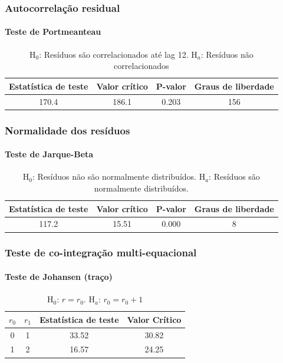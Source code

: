 \documentclass{beamer}
\begin{document}
\begin{frame}
    \frametitle{Autocorrelação residual}
    \framesubtitle{Teste de Portmeanteau}
    \begin{table}[!hbt]
        \begin{tabular}{|cccc|}
            \hline
            Estatística de teste & Valor crítico & P-valor & Graus de liberdade  \\
            \hline
            170.4          &          186.1          &      0.203       &     156      \\
            \hline
        \end{tabular}
        \caption*{$ \text{H}_0 $: Resíduos são correlacionados até lag 12. \newline $ \text{H}_a $: Resíduos não correlacionados}
    \end{table}
\end{frame}


\begin{frame}
    \frametitle{Normalidade dos resíduos}
    \framesubtitle{Teste de Jarque-Beta}
    \begin{table}[!hbt]
        \begin{tabular}{|cccc|}
            \hline
            Estatística de teste & Valor crítico & P-valor & Graus de liberdade  \\
            \hline
            117.2          &          15.51          &      0.000       &      8       \\
            \hline
        \end{tabular}
        \caption*{$ \text{H}_0 $: Resíduos não são normalmente distribuídos. \newline $ \text{H}_a $: Resíduos são normalmente distribuídos.}
    \end{table}
\end{frame}

\begin{frame}
    \frametitle{Teste de co-integração multi-equacional}
    \framesubtitle{Teste de Johansen (traço)}
    \begin{table}[!hbt]
        \begin{tabular}{|cccc|}
            \hline
            $ r_0 $ & $ r_1 $ & Estatística de teste & Valor Crítico \\
            \hline
            0 &             1 &                   33.52 &                   30.82  \\
            1 &             2 &                   16.57 &                   24.25  \\
            \hline
        \end{tabular}
        \caption*{$ \text{H}_0 $: $ r =  r_0 $. $ \text{H}_a $: $ r_0 = r_0 + 1 $}
    \end{table}
\end{frame}
\end{document}
